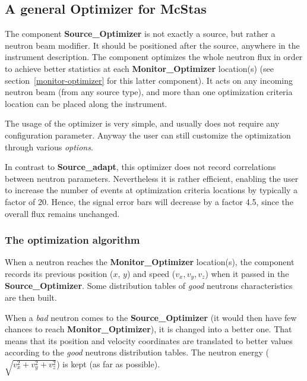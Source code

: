 \subsection*{A general Optimizer for McStas}
\label{source-optimizer}

The component \textbf{Source\_Optimizer} is not exactly a source,
but rather a neutron beam modifier.
It should be positioned after the source, anywhere in the instrument description.
The component  optimizes the whole neutron flux
in order to achieve better statistics at each \textbf{Monitor\_Optimizer}
location(s) (see section~\ref{monitor-optimizer} for this latter
component). It acts on any incoming neutron beam (from any source
type), and more than one optimization criteria location can be placed
along the instrument.

The usage of the optimizer is very simple, and usually does not require
any configuration parameter. Anyway the user can still customize the
optimization through various \textit{options}.

In contrast to \textbf{Source\_adapt}, this optimizer does not
record correlations between neutron parameters.
Nevertheless it is rather efficient,
enabling the user to increase the number of events
at optimization criteria locations by typically a factor of 20.
Hence, the signal error bars will decrease by a factor 4.5,
since the overall flux remains unchanged.

\subsubsection{The optimization algorithm}

When a neutron reaches the \textbf{Monitor\_Optimizer} location(s), the
component records its previous position ($x$, $y$) and speed ($v_x,
v_y, v_z$) when it passed in the \textbf{Source\_Optimizer}. Some
distribution tables of \textit{good} neutrons characteristics are then
built.

When a \textit{bad} neutron comes to the \textbf{Source\_Optimizer} (it would
then have few chances to reach \textbf{Monitor\_Optimizer}), it is changed
into a better one. That means that its position and velocity coordinates
are translated to better values according to the \textit{good} neutrons
distribution tables. The neutron energy
($\sqrt{v_x^2 + v_y^2 + v_z^2}$) is kept (as far as possible).


